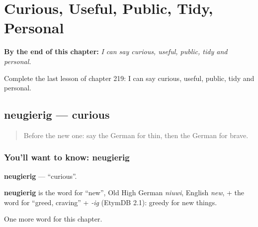 
\chapter{Curious, Useful, Public, Tidy, Personal}
\label{ch:ge-curious-useful-public-tidy-personal}

\begin{chapteropening}
\textbf{By the end of this chapter:} \emph{I can say curious, useful, public, tidy and personal.}

Complete the last lesson of chapter 219: I can say curious, useful, public, tidy and personal.
\end{chapteropening}

\section[neugierig]{neugierig — curious}

\label{lesson:GE-C219-neugierig}



\begin{quote}
Before the new one: say the German for thin, then the German for brave.
\end{quote}

\subsection*{You'll want to know: neugierig}
\textbf{neugierig} — \textquotedblleft{}curious\textquotedblright{}.

\begin{cousinweb}
\textbf{neugierig} is the word for \textquotedblleft{}new\textquotedblright{}, Old High German \emph{niuwi}, English \emph{new}, + the word for \textquotedblleft{}greed, craving\textquotedblright{} + \emph{-ig} (EtymDB 2.1): greedy for new things.
\end{cousinweb}

\begin{grammarlens}[title={What you've built}]
One more word for this chapter.
\end{grammarlens}

